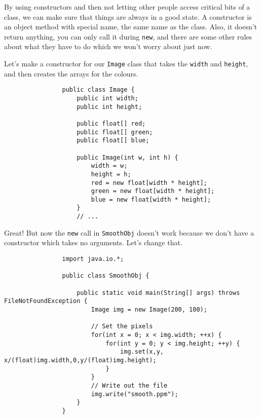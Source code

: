 \documentclass{article}
\begin{document}
            By using constructors and then not letting other people access critical bits of a class, we can make sure that things are
            always in a good state. A constructor is an object method with special name, the same name as the class. Also, it doesn't
            return anything, you can only call it during \texttt{new}, and there are some other rules about what they have to do which we
            won't worry about just now.
            
            Let's make a constructor for our \texttt{Image} class that takes the \texttt{width} and \texttt{height}, and then creates the
            arrays for the colours.
            
            \begin{verbatim}
                public class Image {
                    public int width;
                    public int height;
    
                    public float[] red;
                    public float[] green;
                    public float[] blue;    
            
                    public Image(int w, int h) {
                        width = w;
                        height = h;
                        red = new float[width * height];
                        green = new float[width * height];
                        blue = new float[width * height];
                    }
                    // ...
            \end{verbatim}
            
            Great! But now the \texttt{new} call in \texttt{SmoothObj} doesn't work because we don't have a constructor which takes no
            arguments.  Let's change that.
            
            \begin{verbatim}
                import java.io.*;

                public class SmoothObj {

                    public static void main(String[] args) throws FileNotFoundException {
                        Image img = new Image(200, 100);
                        
                        // Set the pixels
                        for(int x = 0; x < img.width; ++x) {
                            for(int y = 0; y < img.height; ++y) {
                                img.set(x,y, x/(float)img.width,0,y/(float)img.height);
                            }
                        }
                        // Write out the file
                        img.write("smooth.ppm");
                    }
                }
            \end{verbatim}
        
\end{document}
